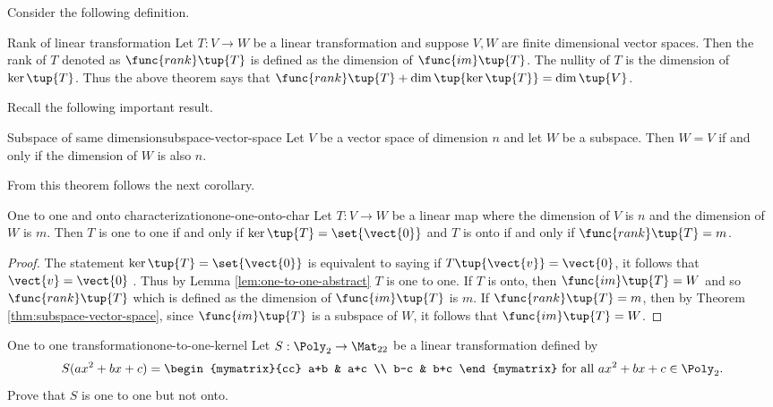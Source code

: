 Consider the following definition. 

\begin{definition}{Rank of linear transformation}{}
Let $T:V\rightarrow W$ be a linear transformation and suppose $V,W$ are finite dimensional vector spaces. Then
the rank of $T$ denoted as $\func{rank}\tup{T} $ is defined as the
dimension of $\func{im}\tup{T} $. The nullity of $T$ is the
dimension of $\ker \tup{T} $. Thus the above theorem says that $
\func{rank}\tup{T} +\dim \tup{\ker \tup{T} } =\dim
\tup{V} $.
\end{definition}

Recall the following important result. 

\begin{theorem}{Subspace of same dimension}{subspace-vector-space}
Let $V$ be a vector space of dimension $n$ and let $W$ be a
subspace. Then $W=V$ if and only if the dimension of $W$ is also $n$.
\end{theorem}

From this theorem follows the next corollary.

\begin{corollary}{One to one and onto characterization}{one-one-onto-char}
Let $T:V\rightarrow W$ be a linear map where the dimension of $V$ is $n$ and
the dimension of $W$ is $m$. Then $T$ is one to one if and only if $\ker
\tup{T} =\set{\vect{0}} $ and $T$ is onto if and only if $
\func{rank}\tup{T} =m$.
\end{corollary}

\begin{proof}
The statement $\ker \tup{T } =\set{\vect{0}} $
is equivalent to saying if $T \tup{\vect{v} }=\vect{0}$, it follows that $\vect{v}=\vect{0}$
. Thus by Lemma \ref{lem:one-to-one-abstract} $T$ is one to one. If $T$ is onto, then $
\func{im}\tup{T} =W$ and so $\func{rank}\tup{T} $ which is
defined as the dimension of $\func{im}\tup{T} $ is $m$. If $\func{
rank}\tup{T} =m$, then by Theorem \ref{thm:subspace-vector-space}, since $\func{im}
\tup{T} $ is a subspace of $W$, it follows that $\func{im}\tup{
T} =W$. 
\end{proof}

\begin{example}{One to one transformation}{one-to-one-kernel}
Let $S:\Poly_2\to\Mat_{22}$ be a linear transformation
defined by
\[ S(ax^2+bx+c)
=
\begin{mymatrix}{cc}
a+b & a+c \\ b-c & b+c \end{mymatrix}
\mbox{ for all }
 ax^2+bx+c\in \Poly_2.\]
Prove that $S$ is one to one but not onto.
\end{example}

